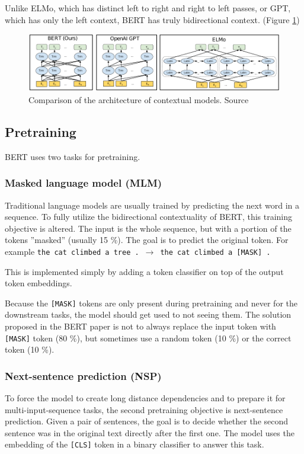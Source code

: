 \documentclass[
  digital, %
  table,   %
  twoside, %
  lof,     %
  lot,     %
]{fithesis3}
\begin{document}
Unlike ELMo, which has distinct left to right and right to left passes, or GPT, which has only the left context, BERT has truly bidirectional context. (Figure \ref{fig:contextual_models})

\begin{figure}[h]
  \label{fig:contextual_models}
  \begin{center}
    \includegraphics[width=\linewidth]{img/contextual_models.pdf}
  \end{center}
  \vspace{-0.5cm}
  \caption{Comparison of the architecture of contextual models. Source \parencite[page 13]{bert}}
\end{figure}



\subsection{Pretraining}
BERT uses two tasks for pretraining.

\subsubsection{Masked language model (MLM)}
Traditional language models are usually trained by predicting the next word in a sequence. To fully utilize the bidirectional contextuality of BERT, this training objective is altered. The input is the whole sequence, but with a portion of the tokens ''masked'' (usually 15 \%). The goal is to predict the original token. For example \texttt{the cat climbed a~tree~.}~$\xrightarrow{}$~\texttt{the cat climbed a [MASK] .}

This is implemented simply by adding a token classifier on top of the output token embeddings.

Because the \texttt{[MASK]} tokens are only present during pretraining and never for the downstream tasks, the model should get used to not seeing them. The solution proposed in the BERT paper \parencite{bert} is not to always replace the input token with \texttt{[MASK]} token (80 \%), but sometimes use a random token (10 \%) or the correct token (10 \%).  

\subsubsection{Next-sentence prediction (NSP)}
To force the model to create long distance dependencies and to prepare it for multi-input-sequence  tasks, the second pretraining objective is next-sentence prediction. Given a pair of sentences, the goal is to decide whether the second sentence was in the original text directly after the first one.  The model uses the embedding of the \texttt{[CLS]} token in a binary classifier to answer this task.
\end{document}
